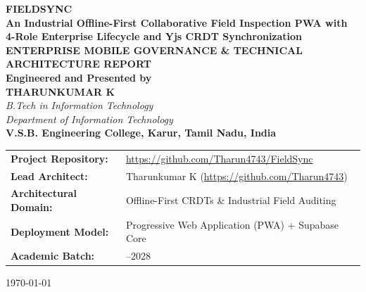 \documentclass[12pt,a4paper]{report}
\begin{document}
\begin{titlepage}
    \centering
    \vspace*{0.8cm}
    
    {\Huge \textbf{FIELDSYNC}}\\[0.3cm]
    {\LARGE \textbf{An Industrial Offline-First Collaborative Field Inspection PWA with 4-Role Enterprise Lifecycle and Yjs CRDT Synchronization}}\\[1.2cm]
    
    {\large \textbf{ENTERPRISE MOBILE GOVERNANCE \& TECHNICAL ARCHITECTURE REPORT}}\\[1.0cm]
    
    \textbf{Engineered and Presented by}\\[0.3cm]
    {\Large \textbf{THARUNKUMAR K}}\\[0.2cm]
    \textit{B.Tech in Information Technology}\\[0.1cm]
    \textit{Department of Information Technology}\\[0.2cm]
    \textbf{V.S.B. Engineering College, Karur, Tamil Nadu, India}\\[1.5cm]
    
    \vfill
    
    \begin{tabular}{>{\raggedright\arraybackslash\bfseries}p{4.2cm}>{\raggedright\arraybackslash}p{10.2cm}}
        Project Repository: & \url{https://github.com/Tharun4743/FieldSync} \\
        Lead Architect: & Tharunkumar K (\url{https://github.com/Tharun4743}) \\
        Architectural Domain: & Offline-First CRDTs \& Industrial Field Auditing \\
        Deployment Model: & Progressive Web Application (PWA) + Supabase Core \\
        Academic Batch: & 2024--2028 \\
    \end{tabular}
    
    \vspace*{0.8cm}
    {\small \today}
\end{titlepage}

\cleardoublepage
{}
\setcounter{page}{1}
\end{document}
